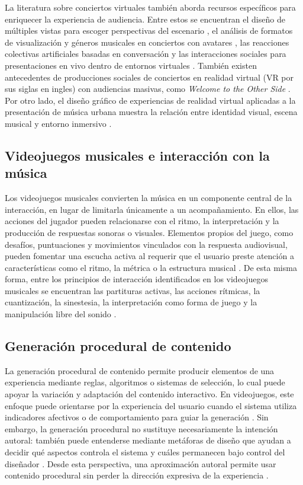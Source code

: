 La literatura sobre conciertos virtuales también aborda recursos específicos para enriquecer la experiencia de audiencia. Entre estos se encuentran el diseño de múltiples vistas para escoger perspectivas del escenario \cite{kim2022multiview}, el análisis de formatos de visualización y géneros musicales en conciertos con avatares \cite{lee2023viewing}, las reacciones colectivas artificiales basadas en conversación \cite{lee2025concert} y las interacciones sociales para presentaciones en vivo dentro de entornos virtuales \cite{yan2020social}. También existen antecedentes de producciones sociales de conciertos en realidad virtual (VR por sus siglas en ingles) con audiencias masivas, como \emph{Welcome to the Other Side} \cite{cacciuttolo2021welcome}. Por otro lado, el diseño gráfico de experiencias de realidad virtual aplicadas a la presentación de música urbana muestra la relación entre identidad visual, escena musical y entorno inmersivo \cite{rivas2025diseno}.
\subsection{Videojuegos musicales e interacción con la música}
Los videojuegos musicales convierten la música en un componente central de la interacción, en lugar de limitarla únicamente a un acompañamiento. En ellos, las acciones del jugador pueden relacionarse con el ritmo, la interpretación y la producción de respuestas sonoras o visuales. Elementos propios del juego, como desafíos, puntuaciones y movimientos vinculados con la respuesta audiovisual, pueden fomentar una escucha activa al requerir que el usuario preste atención a características como el ritmo, la métrica o la estructura musical \cite{mandanici2018good}. De esta misma forma, entre los principios de interacción identificados en los videojuegos musicales se encuentran las partituras activas, las acciones rítmicas, la cuantización, la sinestesia, la interpretación como forma de juego y la manipulación libre del sonido \cite{pichlmair2007levels}.
\subsection{Generación procedural de contenido}
La generación procedural de contenido permite producir elementos de una experiencia mediante reglas, algoritmos o sistemas de selección, lo cual puede apoyar la variación y adaptación del contenido interactivo. En videojuegos, este enfoque puede orientarse por la experiencia del usuario cuando el sistema utiliza indicadores afectivos o de comportamiento para guiar la generación \cite{yannakakis2011experience}. Sin embargo, la generación procedural no sustituye necesariamente la intención autoral: también puede entenderse mediante metáforas de diseño que ayudan a decidir qué aspectos controla el sistema y cuáles permanecen bajo control del diseñador \cite{khaled2013design}. Desde esta perspectiva, una aproximación autoral permite usar contenido procedural sin perder la dirección expresiva de la experiencia \cite{craveirinha2015designing}.

